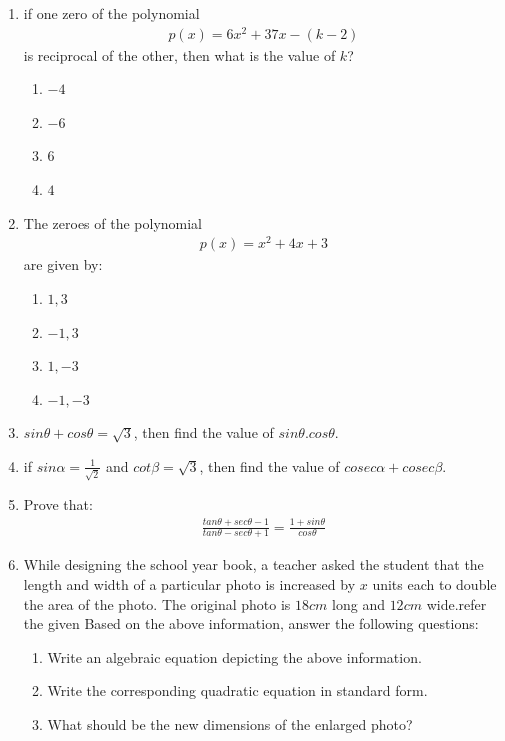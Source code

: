 \documentclass{article}
\begin{document}
\begin{enumerate}
    \item if one zero of the polynomial  \begin{align} p(x)=6x^2+37x-(k-2) \end{align} is reciprocal of the other, then what is the value of $k$?
    \begin{enumerate}
        \item $-4$ \item $-6$ \item $6$ \item $4$
    \end{enumerate}
    \item The zeroes of the polynomial \begin{align} p(x)=x^2+4x+3 \end{align} are given by:
    \begin{enumerate}
        \item $1,3$ \item $-1,3$ \item $1,-3$ \item $-1,-3$
    \end{enumerate}
    \item $sin\theta + cos\theta = \sqrt{3}$, then find the value of $sin\theta.cos\theta$.
    \item if $sin\alpha = \frac{1}{\sqrt{2}}$ and $cot\beta = \sqrt{3}$, then find the value of $cosec\alpha + cosec\beta$.
    \item Prove that:\begin{align}
    \frac{tan\theta+sec\theta-1}{tan\theta-sec\theta+1}=\frac{1+sin\theta}{cos\theta}
    \end{align}
    \item While designing the school year book, a teacher asked the student that the length and width of a particular photo is increased by $x$ units each to double the area of the photo. The original photo is $18 cm$ long and $12 cm$ wide.refer the given 
    Based on the above information, answer the following questions:
    \begin{enumerate}
        \item Write an algebraic equation depicting the above information.
        \item Write the corresponding quadratic equation in standard form.
        \item What should be the new dimensions of the enlarged photo?
    \end{enumerate}
    \begin{figure}[H]

\end{figure}
\end{enumerate}
\end{document}
